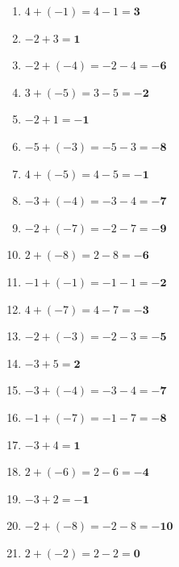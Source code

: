 \documentclass[a4paper,12pt]{article} %
\begin{document}
\begin{enumerate}
  \item \(4 + (-1) = 4 - 1 = \mathbf{3}\) %

  \item \(-2 + 3 = \mathbf{1}\) %

  \item \(-2 + (-4) = -2 - 4 = \mathbf{-6}\) %

  \item \(3 + (-5) = 3 - 5 = \mathbf{-2}\) %

  \item \(-2 + 1 = \mathbf{-1}\) %

  \item \(-5 + (-3) = -5 - 3 = \mathbf{-8}\) %

  \item \(4 + (-5) = 4 - 5 = \mathbf{-1}\) %

  \item \(-3 + (-4) = -3 - 4 = \mathbf{-7}\) %

  \item \(-2 + (-7) = -2 - 7 = \mathbf{-9}\) %

  \item \(2 + (-8) = 2 - 8 = \mathbf{-6}\) %

  \item \(-1 + (-1) = -1 - 1 = \mathbf{-2}\) %

  \item \(4 + (-7) = 4 - 7 = \mathbf{-3}\) %

  \item \(-2 + (-3) = -2 - 3 = \mathbf{-5}\) %

  \item \(-3 + 5 = \mathbf{2}\) %

  \item \(-3 + (-4) = -3 - 4 = \mathbf{-7}\) %

  \item \(-1 + (-7) = -1 - 7 = \mathbf{-8}\) %

  \item \(-3 + 4 = \mathbf{1}\) %

  \item \(2 + (-6) = 2 - 6 = \mathbf{-4}\) %

  \item \(-3 + 2 = \mathbf{-1}\) %

  \item \(-2 + (-8) = -2 - 8 = \mathbf{-10}\) %

  \item \(2 + (-2) = 2 - 2 = \mathbf{0}\) %


\end{enumerate}
\end{document}
